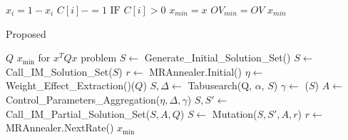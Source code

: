 \begin{algorithm}[t]
\begin{algorithmic}[1]
    \STATE $x_i = 1 - x_i$
    \vspace{-1.5pt}
    \vspace{-1.5pt}
        \STATE $C[i]-=1 \text{ IF } C[i] > 0$
        \vspace{-1.5pt}
    \ENDFOR
    \vspace{-1.5pt}
    \vspace{-1.5pt}
        \STATE $x_{min} = x$
        \vspace{-1.5pt}
        \STATE $OV_{min} = OV$
        \vspace{-1.5pt}
    \ENDIF    
    \vspace{-1.5pt}
\ENDFOR
\vspace{-1.5pt}
\RETURN $x_{min}$
\end{algorithmic}
\end{algorithm}


\begin{algorithm}[t]
\caption{Proposed \alg}\label{alg:alg2}
\begin{algorithmic}[1]
\small
\REQUIRE $Q$
\vspace{-1pt}
\ENSURE $x_{\text{min}}$ for $x^T Q x$ problem
\vspace{-1pt}
\STATE $S \gets$ Generate\_Initial\_Solution\_Set()
\vspace{-1pt}
\STATE $S \gets$ Call\_IM\_Solution\_Set($S$)
\vspace{-1pt}
\STATE $r \gets$ MRAnnealer.Initial()
\vspace{-1pt}
\STATE $\eta \gets$ Weight\_Effect\_Extraction()($Q$)
\vspace{-1pt}
\vspace{-1pt}
    \STATE $S, \Delta \gets$ Tabusearch(Q, $\alpha$, $S$)
    \vspace{-1pt}
    \STATE $\gamma \gets$ ($S$)
    \vspace{-1pt}
    \STATE $A \gets$ Control\_Parameters\_Aggregation($\eta, \Delta, \gamma$)
    \vspace{-1pt}
    \STATE $S, S' \gets$ Call\_IM\_Partial\_Solution\_Set($S, A, Q$)
    \vspace{-1pt}
    \STATE $S \gets$ Mutation($S, S', A, r$)
    \vspace{-1pt}
    \STATE $r \gets$ MRAnnealer.NextRate() 
    \vspace{-1pt}
\ENDWHILE
\vspace{-1pt}
\RETURN $x_{\text{min}}$
\vspace{-1pt}
\end{algorithmic}
\label{alg:proposed_heuristic}
\end{algorithm}

\vspace{-7pt}